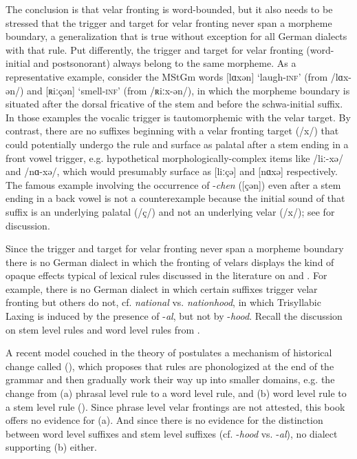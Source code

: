 The conclusion is that velar fronting is word-bounded, but it also needs to be stressed that the trigger and target for velar fronting never span a morpheme boundary, a generalization that is true without exception for all German dialects with that rule. Put differently, the trigger and target for velar fronting (word-initial and postsonorant) always belong to the same morpheme. As a representative example, consider the MStGm words [lɑxən] ‘laugh\textsc{{}-inf}’ (from /lɑx-ən/) and [ʀiːçən] ‘smell\textsc{{}-inf}’ (from /ʀiːx-ən/), in which the morpheme boundary is situated after the dorsal fricative of the stem and before the schwa-initial suffix. In those examples the vocalic trigger is tautomorphemic with the velar target. By contrast, there are no suffixes beginning with a velar fronting target (/x/) that could potentially undergo the rule and surface as palatal after a stem ending in a front vowel trigger, e.g. hypothetical morphologically-complex items like /liː{}-xə/ and /nɑ-xə/, which would presumably surface as [liːçə] and [nɑxə] respectively. The famous example involving the occurrence of -\textit{chen} ([çən]) even after a stem ending in a back vowel is not a counterexample because the initial sound of that suffix is an underlying palatal (/ç/) and not an underlying velar (/x/); see  for discussion.

Since the trigger and target for velar fronting never span a morpheme boundary there is no German dialect in which the fronting of velars displays the kind of opaque effects typical of lexical rules discussed in the literature on  and . For example, there is no German dialect in which certain suffixes trigger velar fronting but others do not, cf. \textit{national} vs. \textit{nationhood}, in which Trisyllabic Laxing is induced by the presence of -\textit{al}, but not by -\textit{hood}. Recall the discussion on stem level rules and word level rules from .

A recent model couched in the theory of  postulates a mechanism of historical change called  (), which proposes that rules are phonologized at the end of the grammar and then gradually work their way up into smaller domains, e.g. the change from (a) phrasal level rule to a word level rule, and (b) word level rule to a stem level rule (\citealt{Bermúdez-Otero2007,Bermúdez-Otero2015,Ramsammy2015}). Since phrase level velar frontings are not attested, this book offers no evidence for (a). And since there is no evidence for the distinction between word level suffixes and stem level suffixes (cf.   {}-\textit{hood} vs. -\textit{al}), no dialect supporting (b) either.

